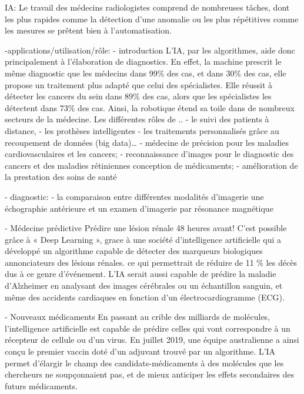     IA: Le travail des médecins radiologistes comprend de nombreuses tâches,
        dont les plus rapides comme la détection d'une anomalie ou les plus
        répétitives comme les mesures se prêtent bien à l'automatisation.


-applications/utilisation/rôle:
- introduction
    L'IA, par les algorithmes, aide donc principalement à l'élaboration de
    diagnostics.
    En effet, la machine prescrit le même diagnostic que les
    médecins dans 99\% des cas, et dans 30\% des cas, elle propose un
    traitement plus adapté que celui des spécialistes. Elle réussit à
    détecter les cancers du sein dans 89\% des cas, alors que les
    spécialistes les détectent dans 73\% des cas. Ainsi, la robotique
    étend sa toile dans de nombreux secteurs de la médecine.
Les différentes rôles de ..
    - le suivi des patients à distance,
    - les prothèses intelligentes
    - les traitements personnalisés grâce au recoupement de données (big data)… 
    - médecine de précision pour les maladies cardiovasculaires et les cancers;
    - reconnaissance d'images pour le diagnostic des cancers et des maladies rétiniennes conception de médicaments;
    - amélioration de la prestation des soins de santé

- diagnostic:
    - la comparaison entre différentes modalités d'imagerie une
      échographie antérieure et un examen d'imagerie par résonance
      magnétique 

- Médecine prédictive
    Prédire une lésion rénale 48 heures avant! C'est possible grâce à «
    Deep Learning  », grace à une société d'intelligence artificielle qui
    a développé un algorithme capable de détecter des marqueurs
    biologiques annonciateurs des lésions rénales. ce qui permettrait de
    réduire de 11 \% les décès dus à ce genre d'événement. L'IA serait
    aussi capable de prédire la maladie d'Alzheimer en analysant des
    images cérébrales ou un échantillon sanguin, et même des accidents
    cardiaques en fonction d'un électrocardiogramme (ECG).

- Nouveaux médicaments
    En passant au crible des milliards de molécules, l'intelligence
    artificielle est capable de prédire celles qui vont correspondre à un
    récepteur de cellule ou d'un virus. En juillet 2019, une équipe
    australienne a ainsi conçu le premier vaccin doté d'un adjuvant trouvé
    par un algorithme. L'IA permet d'élargir le champ des
    candidats-médicaments à des molécules que les chercheurs ne
    soupçonnaient pas, et de mieux anticiper les effets secondaires des
    futurs médicaments.


